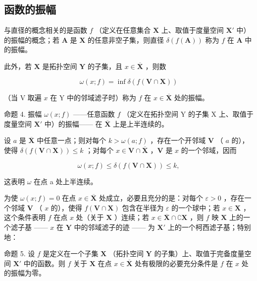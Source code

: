 \subsection{函数的振幅}

与直径的概念相关的是函数 \(f\) （定义在任意集合 \(\mathbf{X}\) 上、取值于度量空间 \(\mathbf{X}'\) 中）的振幅的概念；若 \(\mathbf{A}\) 是 \(\mathbf{X}\) 的任意非空子集，则直径 \(\delta(f(\mathbf{A}))\) 称为 \(f\) 在 \(\mathbf{A}\) 中的振幅。

此外，若 \(\mathbf{X}\) 是拓扑空间 \(\mathbf{Y}\) 的子集，且 \(x \in \overline{\mathbf{X}}\) ，则数

\[
\omega (x; f) = \inf \delta (f (\mathbf {V} \cap \mathbf {X}))
\]

（当 V 取遍 \(x\) 在 Y 中的邻域滤子时）称为 \(f\) 在 \(x \in \overline{\mathbf{X}}\) 处的振幅。

命题 4. 振幅 \(\omega(x; f)\) ——任意函数 \(f\) （定义在拓扑空间 Y 的子集 X 上、取值于度量空间 \(\mathbf{X}'\) 中）的振幅—— 在 \(\overline{\mathbf{X}}\) 上是上半连续的。

设 \(a\) 是 \(\overline{\mathbf{X}}\) 中任意一点；则对每个 \(k > \omega(a; f)\) ，存在一个开邻域 \(\mathbf{V}\) （ \(a\) 的），使得 \(\delta(f(\mathbf{V} \cap \mathbf{X})) \leqslant k\) ；对每个 \(x \in \mathbf{V} \cap \overline{\mathbf{X}}\) ，\(\mathbf{V}\) 是 \(x\) 的一个邻域，因而

\[
\omega (x; f) \leqslant \delta (f (\mathbf {V} \cap \mathbf {X})) \leqslant k,
\]

这表明 \(\omega\) 在点 a 处上半连续。

为使 \(\omega(x; f) = 0\) 在点 \(x \in \overline{\mathbf{X}}\) 处成立，必要且充分的是：对每个 \(\varepsilon > 0\) ，存在一个邻域 \(\mathbf{V}\) （ \(x\) 的），使得 \(f(\mathbf{V} \cap \mathbf{X})\) 包含在半径为 \(\varepsilon\) 的一个球中；若 \(x \in \mathbf{X}\) ，这个条件表明 \(f\) 在点 \(x\) 处（关于 \(\mathbf{X}\) ）连续；若 \(x \in \overline{\mathbf{X}} \cap \complement \mathbf{X}\) ，则 \(f\) 映 \(\mathbf{X}\) 上的一个滤子基 —— \(x\) 在 \(\mathbf{Y}\) 中的邻域滤子的迹 —— 为 \(\mathbf{X}'\) 上的一个柯西滤子基；特别地：

命题 5. 设 \(f\) 是定义在一个子集 \(\mathbf{X}\) （拓扑空间 \(\mathbf{Y}\) 的子集）上、取值于完备度量空间 \(\mathbf{X}'\) 中的函数。则 \(f\) 关于 \(\mathbf{X}\) 在点 \(x \in \overline{\mathbf{X}}\) 处有极限的必要充分条件是 \(f\) 在 \(x\) 处的振幅为零。

